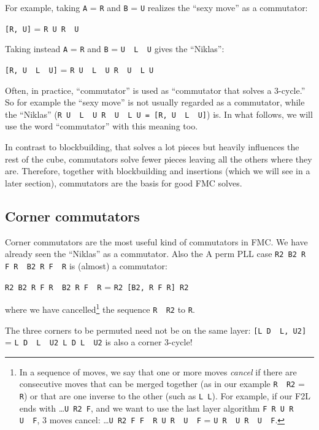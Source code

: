\documentclass[11pt,a4paper]{book}
\newcommand{\p}{\textquotesingle}
\newcommand{\m}{\texttt}
\newcommand{\ps}{\p\,\,}
\begin{document}
For example, taking \m{A} = \m{R} and \m{B} = \m{U} realizes the ``sexy move'' as a commutator:
\begin{center}
\m{[R, U]} = \m{R U R\ps U\p}
\end{center}

Taking instead \m A = \m R and \m B = \m{U\ps L\ps U} gives the ``Niklas'':

\begin{center}
\m{[R, U\ps L\ps U]} = \m{R U\ps L\ps U R\ps U\ps L U}
\end{center}

Often, in practice, ``commutator'' is used as ``commutator that solves a 3-cycle.'' So for example the ``sexy move'' is not usually regarded as a commutator, while the ``Niklas'' (\m{R U\ps L\ps U R\ps U\ps L U = [R, U\ps L\ps U]}) is. In what follows, we will use the word ``commutator'' with this meaning too.

In contrast to blockbuilding, that solves a lot pieces but heavily influences the rest of the cube, commutators solve fewer pieces leaving all the others where they are. Therefore, together with blockbuilding and insertions (which we will see in a later section), commutators are the basis for good FMC solves.

\subsection{Corner commutators}

Corner commutators are the most useful kind of commutators in FMC. We have already seen the ``Niklas'' as a commutator. Also the A perm PLL case \m{R2 B2 R F R\ps B2 R F\ps R} is (almost) a commutator:

\begin{center}
\m{R2 B2 R F R\ps B2 R F\ps R} = \m{R2 [B2, R F R\p] R2}
\end{center}

where we have cancelled\footnote{In a sequence of moves, we say that one or more moves \emph{cancel} if there are consecutive moves that can be merged together (as in our example \m{R\ps R2} = \m R) or that are one inverse to the other (such as \m{L L\p}). For example, if our F2L ends with \dots\m{U R2 F\p}, and we want to use the last layer algorithm \m{F R U R\ps U\ps F\p}, 3 moves cancel:
\dots\m{U R2 F F\ps R U R\ps U\ps F\p} = \m{U R\ps U R\ps U\ps F\p}.} the sequence \m{R\ps R2} to \m R.

The three corners to be permuted need not be on the same layer: \m{[L D\ps L\p, U2]} = \m{L D\ps L\ps U2 L D L\ps U2} is also a corner 3-cycle!
\end{document}

